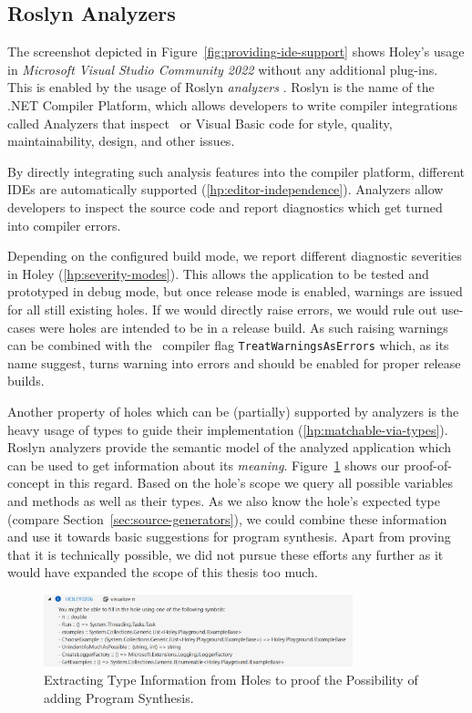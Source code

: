 \subsection{Roslyn Analyzers}
\label{sec:holey-roslyn-analyzers}
The screenshot depicted in Figure~\ref{fig:providing-ide-support} shows Holey's usage in \emph{Microsoft Visual Studio Community 2022} without any additional plug-ins.
This is enabled by the usage of Roslyn \emph{analyzers} \cite{microsoft_code_2023}.
Roslyn is the name of the .NET Compiler Platform, which allows developers to write compiler integrations called Analyzers that inspect \CS\ or Visual Basic code for style, quality, maintainability, design, and other issues.

By directly integrating such analysis features into the compiler platform, different IDEs are automatically supported (\ref{hp:editor-independence}).
Analyzers allow developers to inspect the source code and report diagnostics which get turned into compiler errors.

Depending on the configured build mode, we report different diagnostic severities in Holey (\ref{hp:severity-modes}).
This allows the application to be tested and prototyped in debug mode, but once release mode is enabled, warnings are issued for all still existing holes.
If we would directly raise errors, we would rule out use-cases were holes are intended to be in a release build.
As such raising warnings can be combined with the \CS\ compiler flag \verb|TreatWarningsAsErrors| \cite{microsoft_c_2023} which, as its name suggest, turns warning into errors and should be enabled for proper release builds.

Another property of holes which can be (partially) supported by analyzers is the heavy usage of types to guide their implementation (\ref{hp:matchable-via-types}).
Roslyn analyzers provide the semantic model of the analyzed application which can be used to get information about its \emph{meaning}.
Figure~\ref{fig:reporting-types} shows our proof-of-concept in this regard.
Based on the hole's scope we query all possible variables and methods as well as their types.
As we also know the hole's expected type (compare Section~\ref{sec:source-generators}), we could combine these information and use it towards basic suggestions for program synthesis.
Apart from proving that it is technically possible, we did not pursue these efforts any further as it would have expanded the scope of this thesis too much.

\begin{figure}[ht]
    \centering
    \includegraphics[width=0.8\textwidth]{images/reporting-types}
    \caption{Extracting Type Information from Holes to proof the Possibility of adding Program Synthesis.}
    \label{fig:reporting-types}
\end{figure}

